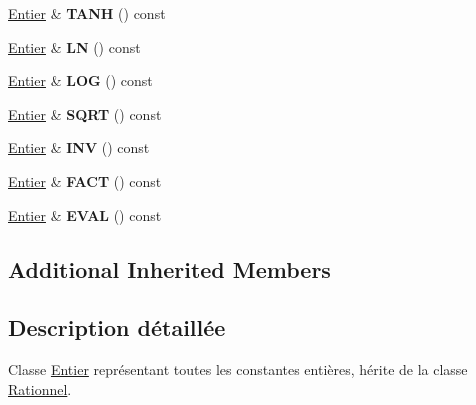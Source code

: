 \begin{DoxyCompactItemize}
\item 
\hypertarget{classcalcul_1_1_entier_a93405672bba677f91549e9493fc4b73e}{\hyperlink{classcalcul_1_1_entier}{Entier} \& {\bfseries T\-A\-N\-H} () const }\label{classcalcul_1_1_entier_a93405672bba677f91549e9493fc4b73e}

\item 
\hypertarget{classcalcul_1_1_entier_ae60d95379e527abecf9d3f64d5b81b15}{\hyperlink{classcalcul_1_1_entier}{Entier} \& {\bfseries L\-N} () const }\label{classcalcul_1_1_entier_ae60d95379e527abecf9d3f64d5b81b15}

\item 
\hypertarget{classcalcul_1_1_entier_a80193288132a92af48fdf6d2fe73291a}{\hyperlink{classcalcul_1_1_entier}{Entier} \& {\bfseries L\-O\-G} () const }\label{classcalcul_1_1_entier_a80193288132a92af48fdf6d2fe73291a}

\item 
\hypertarget{classcalcul_1_1_entier_a8edab0b60f0f0603a433b60b351131a4}{\hyperlink{classcalcul_1_1_entier}{Entier} \& {\bfseries S\-Q\-R\-T} () const }\label{classcalcul_1_1_entier_a8edab0b60f0f0603a433b60b351131a4}

\item 
\hypertarget{classcalcul_1_1_entier_a2c4f45ee53d7d4172fdd793a90256864}{\hyperlink{classcalcul_1_1_entier}{Entier} \& {\bfseries I\-N\-V} () const }\label{classcalcul_1_1_entier_a2c4f45ee53d7d4172fdd793a90256864}

\item 
\hypertarget{classcalcul_1_1_entier_a5b79ae6de2447c5abd72e87e063631aa}{\hyperlink{classcalcul_1_1_entier}{Entier} \& {\bfseries F\-A\-C\-T} () const }\label{classcalcul_1_1_entier_a5b79ae6de2447c5abd72e87e063631aa}

\item 
\hypertarget{classcalcul_1_1_entier_a8b9152f7b127161bfa1070c84799656c}{\hyperlink{classcalcul_1_1_entier}{Entier} \& {\bfseries E\-V\-A\-L} () const }\label{classcalcul_1_1_entier_a8b9152f7b127161bfa1070c84799656c}

\end{DoxyCompactItemize}
\subsection*{Additional Inherited Members}


\subsection{Description détaillée}
Classe \hyperlink{classcalcul_1_1_entier}{Entier} représentant toutes les constantes entières, hérite de la classe \hyperlink{classcalcul_1_1_rationnel}{Rationnel}. 

